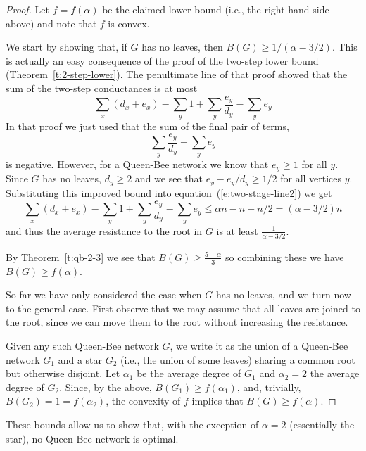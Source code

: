 \documentclass[11pt]{article}
\theoremstyle{remark}
\def\a{\alpha}
\begin{document}
\begin{proof}
  Let $f=f(\a)$ be the claimed lower bound (i.e., the right hand side
  above) and note that $f$ is convex.  

  We start by showing that, if $G$ has no leaves, then
  $B(G)\ge 1/(\a-3/2)$.  This is actually an easy consequence of the
  proof of the two-step lower bound
  (Theorem~\ref{t:2-step-lower}). The penultimate line of that proof
  showed that the sum of the two-step conductances is at most
  \begin{equation}
  \sum_x(d_x+e_x)-\sum_y1 + \sum_y \frac{e_y}{d_y}-\sum_ye_y\label{e:two-stage-line2}    
  \end{equation}
  In that proof we just used that the sum of the final pair of terms,
  \[
  \sum_y \frac{e_y}{d_y}-  \sum_ye_y
  \]
  is negative. However, for a Queen-Bee network we know that
  $e_y\ge 1$ for all $y$.  Since $G$ has no leaves, $d_y\ge 2$ and we
  see that $e_y-e_y/d_y\ge 1/2$ for all vertices $y$.  Substituting
  this improved bound into equation~(\ref{e:two-stage-line2}) we get
  \[
  \sum_x(d_x+e_x)-\sum_y1 + \sum_y \frac{e_y}{d_y}-\sum_ye_y
  \le \a n-n-n/2    = (\a -3/2)n
  \]
  and thus the average resistance to the root in $G$ is at least
  $\frac{1}{\a-3/2}$.

  By Theorem~\ref{t:qb-2-3} we see that $B(G)\ge \frac{5-\a}3$ so
  combining these we have $B(G)\ge f(\a)$.

  \smallskip So far we have only considered the case when $G$ has no
  leaves, and we turn now to the general case.  First observe that we
  may assume that all leaves are joined to the root, since we can move
  them to the root without increasing the resistance.

  Given any such Queen-Bee network $G$, we write it as the union
  of a Queen-Bee network $G_1$ and a star $G_2$ (i.e., the union of
  some leaves) sharing a common root but otherwise disjoint. Let
  $\alpha_1$ be the average degree of $G_1$ and $\alpha_2=2$ the
  average degree of $G_2$. Since, by the above, $B(G_1)\ge
  f(\alpha_1)$, and, trivially, $B(G_2)=1=f(\alpha_2)$, the convexity
  of $f$ implies that $B(G)\ge f(\alpha)$.
\end{proof}

These bounds allow us to show that, with the exception of $\a=2$
(essentially the star), no Queen-Bee network is optimal.
\end{document}
